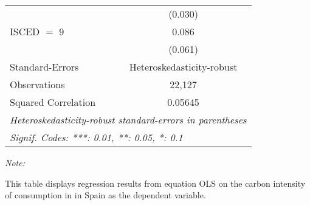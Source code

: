 \begin{table}[htbp!]
\begin{adjustbox}{width = 1\textwidth, max height = 0.95\textheight, center}
\begin{threeparttable}[b]
\begin{tabular}{lc}
                                & (0.030)\\   
            ISCED $=$ 9         & 0.086\\   
                                & (0.061)\\   
            \midrule 
            Standard-Errors     & Heteroskedasticity-robust \\   
            Observations        & 22,127\\  
            Squared Correlation & 0.05645\\  
            \midrule \midrule
            \multicolumn{2}{l}{\emph{Heteroskedasticity-robust standard-errors in parentheses}}\\
            \multicolumn{2}{l}{\emph{Signif. Codes: ***: 0.01, **: 0.05, *: 0.1}}\\
         \end{tabular}
         
         \begin{tablenotes}\item \medskip \textit{Note:}
            \item This table displays regression results from equation OLS on the carbon intensity of consumption in  in Spain as the dependent variable. 
         \end{tablenotes}
      \end{threeparttable}
   \end{adjustbox}
\end{table}


